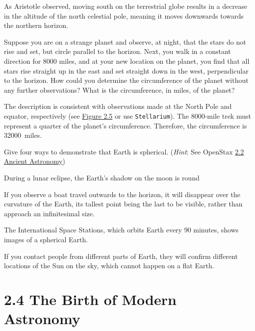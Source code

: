 \documentclass[addpoints]{exam}
\begin{document}
\begin{questions}
\begin{solution}
    As Aristotle observed, moving south on the terrestrial globe results in a decrease in the altitude of the north celestial pole, meaning it moves downwards towards the northern horizon.
\end{solution}

\question %
Suppose you are on a strange planet and observe, at night, that the stars do not rise and set, but circle parallel to the horizon. Next, you walk in a constant direction for 8000 miles, and at your new location on the planet, you find that all stars rise straight up in the east and set straight down in the west, perpendicular to the horizon. How could you determine the circumference of the planet without any further observations? What is the circumference, in miles, of the planet?

\begin{solution}
    The description is consistent with observations made at the North Pole and equator, respectively (see \href{https://openstax.org/books/astronomy-2e/pages/2-1-the-sky-above}{Figure 2.5} or use \texttt{Stellarium}). The 8000-mile trek must represent a quarter of the planet's circumference. Therefore, the circumference is \SI{32000}{miles}.
\end{solution}

\question %
Give four ways to demonstrate that Earth is spherical. (\textit{Hint}: See OpenStax \href{https://openstax.org/books/astronomy-2e/pages/2-2-ancient-astronomy}{2.2 Ancient Astronomy})

\begin{solution}
    During a lunar eclipse, the Earth's shadow on the moon is round

    If you observe a boat travel outwards to the horizon, it will disappear over the curvature of the Earth, its tallest point being the last to be visible, rather than approach an infinitesimal size.

    The International Space Stations, which orbits Earth every 90 minutes, shows images of a spherical Earth.

    If you contact people from different parts of Earth, they will confirm different locations of the Sun on the sky, which cannot happen on a flat Earth.
\end{solution}

\section*{2.4 The Birth of Modern Astronomy}


\end{questions}
\end{document}
